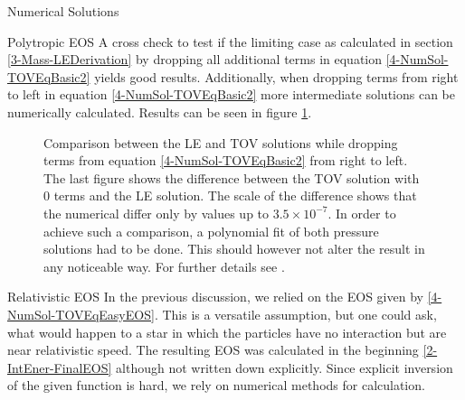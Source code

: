 \begin{section}{Numerical Solutions}
\begin{subsection}{Polytropic EOS}
A cross check to test if the limiting case as calculated in section \ref{3-Mass-LEDerivation} by dropping all additional terms in equation \ref{4-NumSol-TOVEqBasic2} yields good results. Additionally, when dropping terms from right to left in equation \ref{4-NumSol-TOVEqBasic2} more intermediate solutions can be numerically calculated. Results can be seen in figure \ref{4-NumSol-TovTerms}.
\begin{figure}[ht]
	\centering
	
	\caption[Comparison LE and partial TOV]{Comparison between the LE and TOV solutions while dropping terms from equation \ref{4-NumSol-TOVEqBasic2} from right to left. The last figure shows the difference between the TOV solution with 0 terms and the LE solution. The scale of the difference shows that the numerical differ only by values up to $3.5\times10^{-7}$. In order to achieve such a comparison, a polynomial fit of both pressure solutions had to be done. This should however not alter the result in any noticeable way. For further details see \cite{pleyerGithubRepositoryJonas}.}
	\label{4-NumSol-TovTerms}
\end{figure}

\end{subsection}
%
%
\begin{subsection}{Relativistic EOS}
In the previous discussion, we relied on the EOS given by \ref{4-NumSol-TOVEqEasyEOS}. This is a versatile assumption, but one could ask, what would happen to a star in which the particles have no interaction but are near relativistic speed. The resulting EOS was calculated in the beginning \ref{2-IntEner-FinalEOS} although not written down explicitly. Since explicit inversion of the given function is hard, we rely on numerical methods for calculation.

\end{subsection}
%
%
\end{section}
